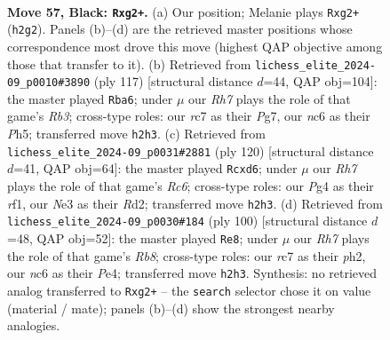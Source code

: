 \documentclass[11pt]{article}
\begin{document}
\clearpage

\begin{figure}[p]\centering
\begin{subfigure}{0.46\textwidth}\centering
\resizebox{\linewidth}{!}{%
\newchessgame
\chessboard[
  setfen={1r6/2R5/2Np1k2/8/6pp/1p2n3/3R2Pr/6K1 b - - 5 57},
  showmover=false,
  pgfstyle=straightmove, color=movearrow, markmove={h2-g2}
]}
\caption{}
\end{subfigure}\hfill
\begin{subfigure}{0.46\textwidth}\centering
\resizebox{\linewidth}{!}{%
\newchessgame
\chessboard[
  setfen={8/6p1/1r5k/rPK4p/8/6PP/pR6/R7 b - - 2 59},
  showmover=false,
  pgfstyle=straightmove, color=movearrow, markmove={b6-a6}
]}
\caption{}
\end{subfigure}
\\[4pt]
\begin{subfigure}{0.46\textwidth}\centering
\resizebox{\linewidth}{!}{%
\newchessgame
\chessboard[
  setfen={8/1k6/2Rp2r1/1P4P1/P3p3/1KP5/3R4/5r2 w - - 6 61},
  showmover=false,
  pgfstyle=straightmove, color=movearrow, markmove={c6-d6}
]}
\caption{}
\end{subfigure}\hfill
\begin{subfigure}{0.46\textwidth}\centering
\resizebox{\linewidth}{!}{%
\newchessgame
\chessboard[
  setfen={1R4nr/k5p1/8/P3p3/1P2P3/5P2/7p/7K w - - 5 51},
  showmover=false,
  pgfstyle=straightmove, color=movearrow, markmove={b8-e8}
]}
\caption{}
\end{subfigure}
\caption{\textbf{Move 57, Black: \texttt{Rxg2+}.} (a) Our position; Melanie plays \texttt{Rxg2+} (\texttt{h2g2}). Panels (b)--(d) are the retrieved master positions whose correspondence most drove this move (highest QAP objective among those that transfer to it). (b) Retrieved from \texttt{lichess\_elite\_2024-09\_p0010\#3890} (ply 117) [structural distance $d$=44, QAP obj=104]: the master played \texttt{Rba6}; under $\mu$ our \emph{Rh7} plays the role of that game's \emph{Rb3}; cross-type roles: our \emph{r}c7 as their \emph{P}g7, our \emph{n}c6 as their \emph{P}h5; transferred move \texttt{h2h3}. (c) Retrieved from \texttt{lichess\_elite\_2024-09\_p0031\#2881} (ply 120) [structural distance $d$=41, QAP obj=64]: the master played \texttt{Rcxd6}; under $\mu$ our \emph{Rh7} plays the role of that game's \emph{Rc6}; cross-type roles: our \emph{P}g4 as their \emph{r}f1, our \emph{N}e3 as their \emph{R}d2; transferred move \texttt{h2h3}. (d) Retrieved from \texttt{lichess\_elite\_2024-09\_p0030\#184} (ply 100) [structural distance $d$=48, QAP obj=52]: the master played \texttt{Re8}; under $\mu$ our \emph{Rh7} plays the role of that game's \emph{Rb8}; cross-type roles: our \emph{r}c7 as their \emph{p}h2, our \emph{n}c6 as their \emph{P}e4; transferred move \texttt{h2h3}. Synthesis: no retrieved analog transferred to \texttt{Rxg2+} -- the \texttt{search} selector chose it on value (material / mate); panels (b)--(d) show the strongest nearby analogies.}
\label{fig:thought-m113}
\end{figure}
\end{document}
